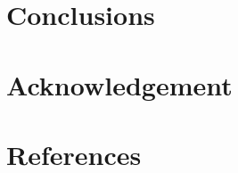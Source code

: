 \documentclass[]{elsarticle}
\theoremstyle{definition}
\begin{document}
%
%
%
%


\section{Conclusions}\label{conclusions}
  


     
\section*{Acknowledgement}

          
\section*{References}


\end{document}
